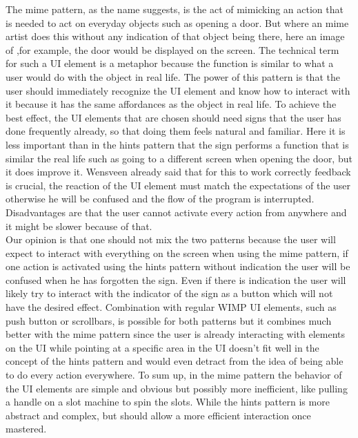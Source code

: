 The mime pattern, as the name suggests, is the act of mimicking an action that is needed to act on everyday objects such as opening a door. But where an mime artist does this without any indication of that object being there, here an image of ,for example, the door would be displayed on the screen. The technical term for such a UI element is a metaphor because the function is similar to what a user would do with the object in real life. The power of this pattern is that the user should immediately recognize the UI element and know how to interact with it because it has the same affordances as the object in real life. To achieve the best effect, the UI elements that are chosen should need signs that the user has done frequently already, so that doing them feels natural and familiar. Here it is less important than in the hints pattern that the sign performs a function that is similar the real life such as going to a different screen when opening the door, but it does improve it. Wensveen \cite{Wensveen2004} already said that for this to work correctly feedback is crucial, the reaction of the UI element must match the expectations of the user otherwise he will be confused and the flow of the program is interrupted. Disadvantages are that the user cannot activate every action from anywhere and it might be slower because of that.\\

Our opinion is that one should not mix the two patterns because the user will expect to interact with everything on the screen when using the mime pattern, if one action is activated using the hints pattern without indication the user will be confused when he has forgotten the sign. Even if there is indication the user will likely try to interact with the indicator of the sign as a button which will not have the desired effect. Combination with regular WIMP UI elements, such as push button or scrollbars, is possible for both patterns but it combines much better with the mime pattern since the user is already interacting with elements on the UI while pointing at a specific area in the UI doesn't fit well in the concept of the hints pattern and would even detract from the idea of being able to do every action everywhere. To sum up, in the mime pattern the behavior of the UI elements are simple and obvious but possibly more inefficient, like pulling a handle on a slot machine to spin the slots. While the hints pattern is more abstract and complex, but should allow a more efficient interaction once mastered.


